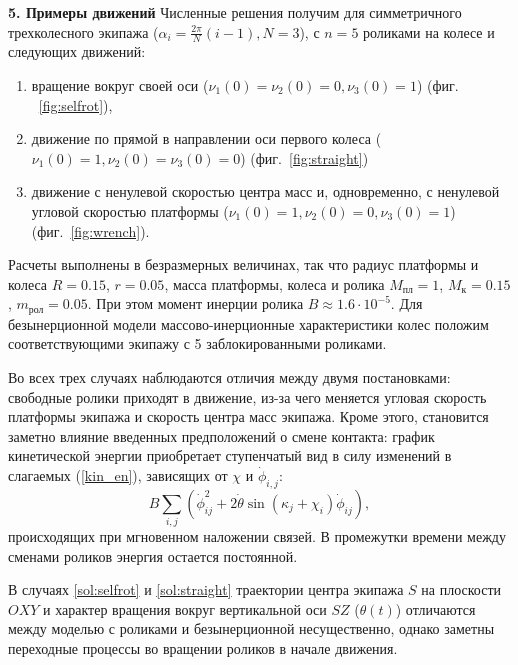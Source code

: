 
{\bf 5. Примеры движений}
Численные решения получим для симметричного трехколесного экипажа ($\alpha_i = \frac{2\pi}{N}(i - 1), N = 3$), с $n = 5$ роликами на колесе и следующих движений:
\begin{enumerate}
  \item \label{sol:selfrot} вращение вокруг своей оси ($\nu_1(0) = \nu_2(0) = 0, \nu_3(0) = 1$) (фиг. ~\ref{fig:selfrot}),
  \item \label{sol:straight} движение по прямой в направлении оси первого колеса ($\nu_1(0) = 1, \nu_2(0) = \nu_3(0) = 0$) (фиг.~\ref{fig:straight})
  \item \label{sol:wrench} движение с ненулевой скоростью центра масс и, одновременно, с ненулевой угловой скоростью платформы ($\nu_1(0) = 1, \nu_2(0) = 0, \nu_3(0) = 1$) (фиг.~\ref{fig:wrench}).
\end{enumerate}


Расчеты выполнены в безразмерных величинах, так что радиус платформы и колеса $R = 0.15$, $r = 0.05$, масса платформы, колеса и ролика $M_{\text{пл}} = 1$, $ M_{\text{к}} = 0.15$, $m_{\text{рол}} = 0.05$. При этом момент инерции ролика $B \approx 1.6 \cdot 10^{-5}$. Для безынерционной модели массово-инерционные характеристики колес положим соответствующими экипажу с 5 заблокированными роликами.

Во всех трех случаях наблюдаются отличия между двумя постановками: свободные ролики приходят в движение, из-за чего меняется угловая скорость платформы экипажа и скорость центра масс экипажа. Кроме этого, становится заметно влияние введенных предположений о смене контакта: график кинетической энергии приобретает ступенчатый вид в силу изменений в слагаемых (\ref{kin_en}), зависящих от $\chi$ и $\dot{\phi}_{i,j}$: 
\begin{equation}\label{sines_in_kin_en}
    B\sum_{i,j}(\dot{\phi}_{ij}^2 + 2\dot{\theta}\sin(\kappa_j + \chi_i)\dot{\phi}_{ij}),
\end{equation}
происходящих при мгновенном наложении связей. В промежутки времени между сменами роликов энергия остается постоянной. 

В случаях \ref{sol:selfrot} и \ref{sol:straight} траектории центра экипажа $S$ на плоскости $OXY$ и характер вращения вокруг вертикальной оси $SZ$ ($\theta(t)$) отличаются между моделью с роликами и безынерционной несущественно, однако заметны переходные процессы во вращении роликов в начале движения.

